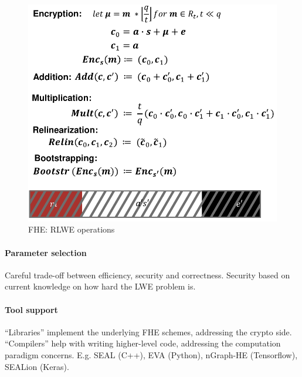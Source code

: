 \begin{figure}[h]
    \centering
	\includegraphics[scale=0.4]{images/fhe-rlwe.png}
    \caption{FHE: RLWE operations}
    \label{fig:fhe-rlwe}
\end{figure}

\paragraph{Parameter selection}
Careful trade-off between efficiency, security and correctness.
Security based on current knowledge on how hard the LWE problem is.

\paragraph{Tool support}
``Libraries'' implement the underlying FHE schemes, addressing the crypto side.
``Compilers'' help with writing higher-level code, addressing the computation paradigm concerns.
E.g. SEAL (C++), EVA (Python), nGraph-HE (Tensorflow), SEALion (Keras).

